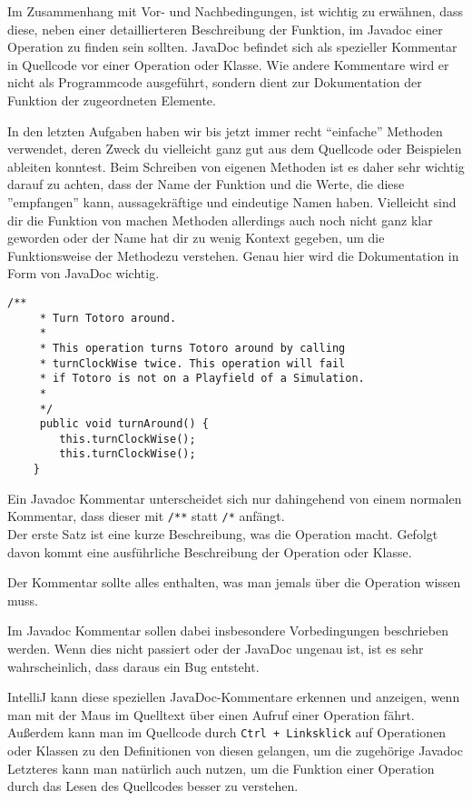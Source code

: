 \newpage

\begin{Infobox}[JavaDoc]
    Im Zusammenhang mit Vor- und Nachbedingungen, ist wichtig zu erwähnen, dass diese, neben einer detaillierteren Beschreibung der Funktion, im Javadoc einer Operation zu finden sein sollten.
JavaDoc befindet sich als spezieller Kommentar in Quellcode vor einer Operation oder Klasse.
Wie andere Kommentare wird er nicht als Programmcode ausgeführt, sondern dient zur Dokumentation der Funktion der zugeordneten Elemente.

In den letzten Aufgaben haben wir bis jetzt immer recht \enquote{einfache} Methoden verwendet, deren Zweck du vielleicht ganz gut aus dem Quellcode oder Beispielen ableiten konntest.
Beim Schreiben von eigenen Methoden ist es daher sehr wichtig darauf zu achten, dass der Name der Funktion und die Werte, die diese ''empfangen'' kann, aussagekräftige und eindeutige Namen haben.
Vielleicht sind dir die Funktion von machen Methoden allerdings auch noch nicht ganz klar geworden oder der Name hat dir  zu wenig Kontext gegeben, um die Funktionsweise der Methodezu verstehen.
Genau hier wird die Dokumentation in Form von JavaDoc wichtig.

    \begin{lstlisting}[numbers=none]
    /**
     * Turn Totoro around.
     *
     * This operation turns Totoro around by calling
     * turnClockWise twice. This operation will fail 
     * if Totoro is not on a Playfield of a Simulation.
     *
     */
     public void turnAround() {
        this.turnClockWise();
        this.turnClockWise();
    }
    \end{lstlisting}

    Ein Javadoc Kommentar unterscheidet sich nur dahingehend von einem normalen Kommentar, dass dieser mit \lstinline{/**} statt \lstinline{/*} anfängt.\\

Der erste Satz ist eine kurze Beschreibung, was die Operation macht.
Gefolgt davon kommt eine ausführliche Beschreibung der Operation oder Klasse.

Der Kommentar sollte alles enthalten, was man jemals über die Operation wissen muss.

Im Javadoc Kommentar sollen dabei insbesondere Vorbedingungen beschrieben werden.
Wenn dies nicht passiert oder der JavaDoc ungenau ist, ist es sehr wahrscheinlich, dass daraus ein Bug entsteht.

IntelliJ kann diese speziellen JavaDoc-Kommentare erkennen und anzeigen, wenn man mit der Maus im Quelltext über einen Aufruf einer Operation fährt.
Außerdem kann man im Quellcode durch \lstinline{Ctrl + Linksklick} auf Operationen oder Klassen zu den Definitionen von diesen gelangen, um die zugehörige Javadoc
Letzteres kann man natürlich auch nutzen, um die Funktion einer Operation durch das Lesen des Quellcodes besser zu verstehen.
\end{Infobox}

